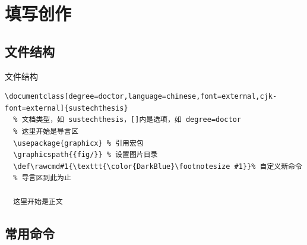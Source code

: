\section{填写创作}



\subsection{文件结构}

\begin{frame}[fragile]{文件结构}
    \lstset{language=[LaTeX]TeX}
    \begin{lstlisting}[basicstyle=\ttfamily]
  \documentclass[degree=doctor,language=chinese,font=external,cjk-font=external]{sustechthesis}
  % 文档类型，如 sustechthesis，[]内是选项，如 degree=doctor
  % 这里开始是导言区
  \usepackage{graphicx} % 引用宏包
  \graphicspath{{fig/}} % 设置图片目录
  \def\rawcmd#1{\texttt{\color{DarkBlue}\footnotesize #1}}% 自定义新命令
  % 导言区到此为止
  
  这里开始是正文
  \end{lstlisting}
\end{frame}

\subsection{常用命令}

